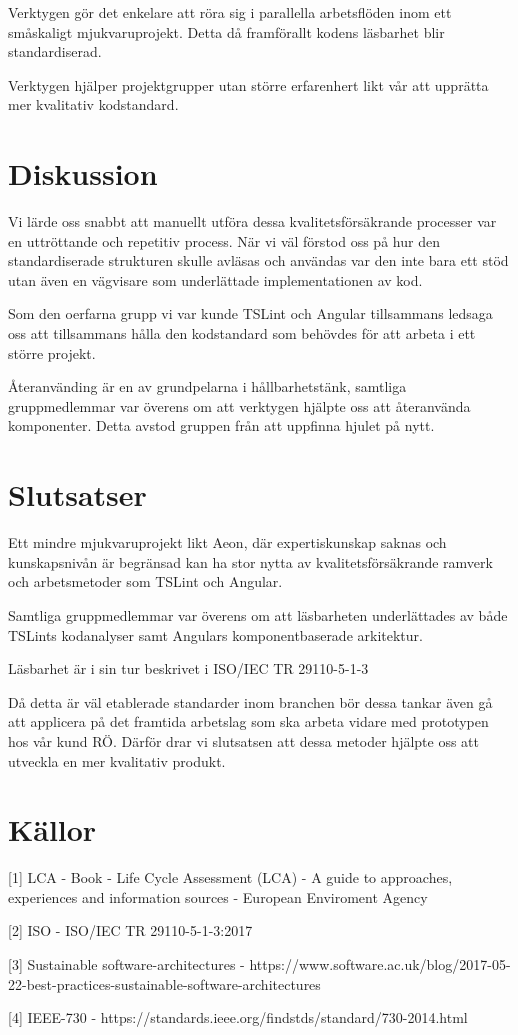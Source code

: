 Verktygen gör det enkelare att röra sig i parallella arbetsflöden inom ett småskaligt mjukvaruprojekt. Detta då framförallt kodens läsbarhet blir standardiserad.

Verktygen hjälper projektgrupper utan större erfarenhert likt vår att upprätta mer kvalitativ kodstandard.

\section{Diskussion}

Vi lärde oss snabbt att manuellt utföra dessa kvalitetsförsäkrande processer var en uttröttande och repetitiv process. När vi väl förstod oss på hur den standardiserade strukturen skulle avläsas och användas var den inte bara ett stöd utan även en vägvisare som underlättade implementationen av kod.

Som den oerfarna  grupp vi var kunde TSLint och Angular tillsammans ledsaga oss att tillsammans hålla den kodstandard som behövdes för att arbeta i ett större projekt. 

Återanvänding är en av grundpelarna i hållbarhetstänk, samtliga gruppmedlemmar var överens om att verktygen hjälpte oss att återanvända komponenter. Detta avstod gruppen från att uppfinna hjulet på nytt.
\section{Slutsatser}

Ett mindre mjukvaruprojekt likt Aeon, där expertiskunskap saknas och kunskapsnivån är begränsad kan ha stor nytta av kvalitetsförsäkrande ramverk och arbetsmetoder som TSLint och Angular. 

Samtliga gruppmedlemmar var överens om att läsbarheten underlättades av både TSLints kodanalyser samt Angulars komponentbaserade arkitektur.

Läsbarhet är i sin tur beskrivet i ISO/IEC TR 29110-5-1-3

Då detta är väl etablerade standarder inom branchen bör dessa tankar även gå att applicera på det framtida arbetslag som ska arbeta vidare med prototypen hos vår kund RÖ. Därför drar vi slutsatsen att dessa metoder hjälpte oss att utveckla en mer kvalitativ produkt.

\section{Källor}

[1] LCA - Book - Life Cycle Assessment (LCA) - A guide to approaches, experiences and information sources - European Enviroment Agency 

[2] ISO - ISO/IEC TR 29110-5-1-3:2017 

[3] Sustainable software-architectures -  https://www.software.ac.uk/blog/2017-05-22-best-practices-sustainable-software-architectures 

[4] IEEE-730 - https://standards.ieee.org/findstds/standard/730-2014.html 

